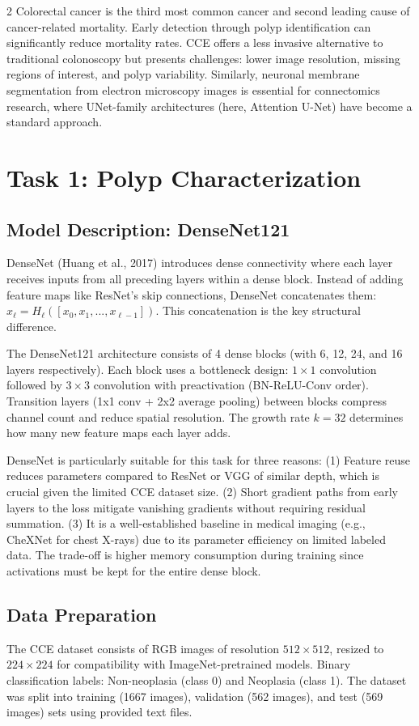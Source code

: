 ﻿\documentclass[a4paper,10pt]{article}
\begin{document}
\begin{multicols*}{2}
Colorectal cancer is the third most common cancer and second leading cause of cancer-related mortality. Early detection through polyp identification can significantly reduce mortality rates. CCE offers a less invasive alternative to traditional colonoscopy but presents challenges: lower image resolution, missing regions of interest, and polyp variability. Similarly, neuronal membrane segmentation from electron microscopy images is essential for connectomics research, where UNet-family architectures (here, Attention U-Net) have become a standard approach.

\section{Task 1: Polyp Characterization}

\subsection{Model Description: DenseNet121}
DenseNet (Huang et al., 2017) introduces dense connectivity where each layer receives inputs from all preceding layers within a dense block. Instead of adding feature maps like ResNet's skip connections, DenseNet concatenates them: \(x_\ell = H_\ell([x_0, x_1, ..., x_{\ell-1}])\). This concatenation is the key structural difference.

The DenseNet121 architecture consists of 4 dense blocks (with 6, 12, 24, and 16 layers respectively). Each block uses a bottleneck design: \(1 \times 1\) convolution followed by \(3 \times 3\) convolution with preactivation (BN-ReLU-Conv order). Transition layers (1x1 conv + 2x2 average pooling) between blocks compress channel count and reduce spatial resolution. The growth rate \(k=32\) determines how many new feature maps each layer adds.

DenseNet is particularly suitable for this task for three reasons: (1) Feature reuse reduces parameters compared to ResNet or VGG of similar depth, which is crucial given the limited CCE dataset size. (2) Short gradient paths from early layers to the loss mitigate vanishing gradients without requiring residual summation. (3) It is a well-established baseline in medical imaging (e.g., CheXNet for chest X-rays) due to its parameter efficiency on limited labeled data. The trade-off is higher memory consumption during training since activations must be kept for the entire dense block.

\subsection{Data Preparation}
The CCE dataset consists of RGB images of resolution \(512 \times 512\), resized to \(224 \times 224\) for compatibility with ImageNet-pretrained models. Binary classification labels: Non-neoplasia (class 0) and Neoplasia (class 1). The dataset was split into training (1667 images), validation (562 images), and test (569 images) sets using provided text files.


\end{multicols*}
\end{document}
